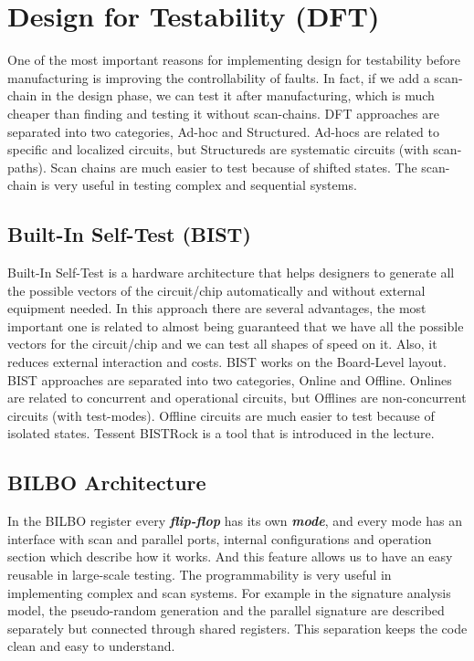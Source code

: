 \documentclass[12pt, a4paper, twocolumn]{article}
\begin{document}
\section{Design for Testability (DFT)}
One of the most important reasons for implementing design for testability before manufacturing is improving the controllability of faults.
In fact, if we add a scan-chain in the design phase, we can test it after manufacturing, which is much cheaper than finding and testing it without scan-chains.
DFT approaches are separated into two categories, Ad-hoc and Structured.
Ad-hocs are related to specific and localized circuits, but Structureds are systematic circuits (with scan-paths).
Scan chains are much easier to test because of shifted states.
The scan-chain is very useful in testing complex and sequential systems.

\subsection{Built-In Self-Test (BIST)}
Built-In Self-Test is a hardware architecture that helps designers to generate all the possible vectors of the circuit/chip automatically and without external equipment needed.
In this approach there are several advantages, the most important one is related to almost being guaranteed that we have all the possible vectors for the circuit/chip and we can test all shapes of speed on it.
Also, it reduces external interaction and costs.
BIST works on the Board-Level layout.
BIST approaches are separated into two categories, Online and Offline.
Onlines are related to concurrent and operational circuits, but Offlines are non-concurrent circuits (with test-modes).
Offline circuits are much easier to test because of isolated states.
Tessent BISTRock is a tool that is introduced in the lecture.

\subsection{BILBO Architecture}
In the BILBO register every \textbf{\textit{flip-flop}} has its own \textbf{\textit{mode}}, and every mode has an interface with scan and parallel ports, internal configurations and operation section which describe how it works.
And this feature allows us to have an easy reusable in large-scale testing.
The programmability is very useful in implementing complex and scan systems.
For example in the signature analysis model, the pseudo-random generation and the parallel signature are described separately but connected through shared registers.
This separation keeps the code clean and easy to understand.
\end{document}
